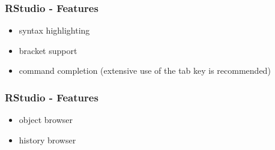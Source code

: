 \documentclass[xcolor={table},c]{beamer}
\begin{document}
\begin{frame}\frametitle{RStudio - Features}
  \begin{itemize}
    \item syntax highlighting
    \item bracket support
    \item command completion (extensive use of the tab key is recommended)
  \end{itemize}
\begin{center}
\end{center}
\end{frame}


\begin{frame}\frametitle{RStudio - Features}
  \begin{itemize}
    \item object browser
    \item history browser
  \end{itemize}
\begin{center}
\end{center}
\end{frame}
\end{document}
